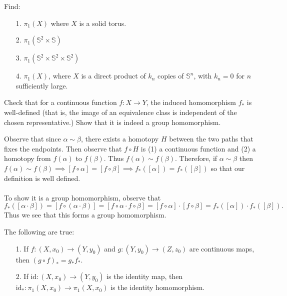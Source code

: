 \documentclass[a4paper,12pt,twoside]{hmcpset}
\begin{document}
\begin{exercise}[Exercise 13.16]Find:
\begin{itemize}
    \item[1.] $\pi_1(X)$ where $X$ is a solid torus.
    \item[2.] $\pi_1(\mathbb{S}^2 \times \mathbb{S})$
    \item[3.] $\pi_1(\mathbb{S}^2\times \mathbb{S}^2 \times \mathbb{S}^2)$
    \item[4.] $\pi_1(X)$, where $X$ is a direct product of $k_n$
    copies of $\mathbb{S}^n$, with $k_n = 0$ for $n$ sufficiently
    large.
\end{itemize}
\end{exercise}


\begin{exercise}[Exercise 13.18] 
Check that for a continuous function $f : X
\to Y$, the induced homomorphism $f_*$ is well-defined (that is, the
image of an equivalence class is independent of the chosen
representative.) Show that it is indeed a group homomorphism.
\end{exercise}

\begin{solution}
Observe that since $\alpha \sim \beta$, there exists a homotopy
$H$ between the two paths that fixes the endpoints. Then observe
that $f \circ H$ is (1) a continuous function and (2) a homotopy 
from $f(\alpha)$ to $f(\beta)$. Thus $f(\alpha) \sim f(\beta)$.
Therefore, 
if $\alpha \sim \beta$ then $f(\alpha) \sim f(\beta) 
\implies [f \circ \alpha] = [f \circ \beta] \implies 
f_*([\alpha]) = f_*([\beta])$ so that our definition is
well defined.
\\
\\
To show it is a group homomorphism, observe that 
\[
  f_*([\alpha \cdot \beta]) = [f \circ (\alpha \cdot \beta)]
  = [f \circ \alpha \cdot f \circ \beta] = [f \circ \alpha] \cdot [f \circ \beta]
  = f_*([\alpha]) \cdot f_*([\beta]).
\]
Thus we see that this forms a group homomorphism. 
\end{solution}


\begin{problem}[Theorem 13.19]
    The following are true:
    \begin{itemize}
        \item[1.] If $f: (X, x_0) \to (Y, y_0)$ and $g: (Y, y_0)
        \to (Z, z_0)$ are continuous maps, then $(g \circ f)_* = g_*
        f_*.$
        
        \item[2.] If $\text{id}:(X, x_0) \to (Y, y_0)$ is the identity
        map, then $\text{id}_*: \pi_1(X, x_0) \to \pi_1(X, x_0)$ is
        the identity homomorphism.        
    \end{itemize}
\end{problem}
\end{document}
